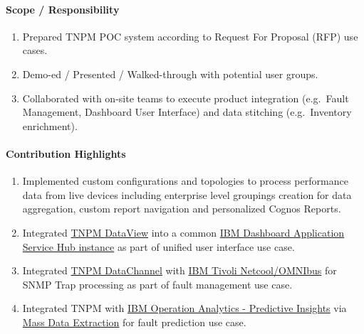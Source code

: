 \documentclass[
]{article}
\providecommand{\tightlist}{%
  \setlength{\itemsep}{0pt}\setlength{\parskip}{0pt}}
\begin{document}
\hypertarget{scope-responsibility-8}{%
\paragraph{Scope / Responsibility}\label{scope-responsibility-8}}

\begin{enumerate}
\def\labelenumi{\arabic{enumi}.}
\tightlist
\item
  Prepared TNPM POC system according to Request For Proposal (RFP) use
  cases.
\item
  Demo-ed / Presented / Walked-through with potential user groups.
\item
  Collaborated with on-site teams to execute product integration
  (e.g.~Fault Management, Dashboard User Interface) and data stitching
  (e.g.~Inventory enrichment).
\end{enumerate}

\hypertarget{contribution-highlights-7}{%
\paragraph{Contribution Highlights}\label{contribution-highlights-7}}

\begin{enumerate}
\def\labelenumi{\arabic{enumi}.}
\tightlist
\item
  Implemented custom configurations and topologies to process
  performance data from live devices including enterprise level
  groupings creation for data aggregation, custom report navigation and
  personalized Cognos Reports.
\item
  Integrated
  \href{https://www.ibm.com/support/knowledgecenter/SSBNJ7_1.3.2/com.ibm.tnpm.doc/DataView/ctnpm_dv_userguide.html}{TNPM
  DataView} into a common
  \href{https://www.ibm.com/developerworks/community/groups/service/html/communitystart?communityUuid=b8caedd7-3aca-41c1-a9c1-7be87a51c50e}{IBM
  Dashboard Application Service Hub instance} as part of unified user
  interface use case.
\item
  Integrated
  \href{http://www.ibm.com/support/knowledgecenter/SSBNJ7_1.4.1/install/ctnpm_installguide_tivolinetcoolperformancemanagerarchitecture-03-02.html}{TNPM
  DataChannel} with
  \href{http://www-03.ibm.com/software/products/en/ibmtivolinetcoolomnibus}{IBM
  Tivoli Netcool/OMNIbus} for SNMP Trap processing as part of fault
  management use case.
\item
  Integrated TNPM with
  \href{http://www-03.ibm.com/software/products/en/ibm-operations-analytics---predictive-insights}{IBM
  Operation Analytics - Predictive Insights} via
  \href{https://www.ibm.com/support/knowledgecenter/SSBNJ7_1.3.2/com.ibm.tnpm.doc/pdf/pdf_tnpm_mass_data_extraction.pdf}{Mass
  Data Extraction} for fault prediction use case.
\end{enumerate}
\end{document}
